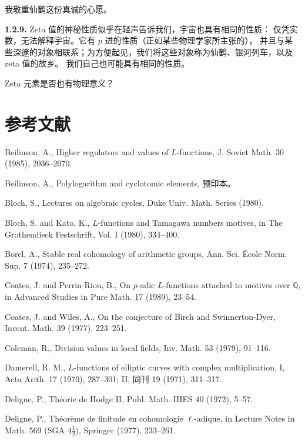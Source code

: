 我敬重仙鹤这份真诚的心愿。

\noindent\textbf{1.2.9.} Zeta 值的神秘性质似乎在轻声告诉我们，宇宙也具有相同的性质：
仅凭实数，无法解释宇宙。它有 $p$ 进的性质（正如某些物理学家所主张的），
并且与某些深邃的对象相联系；为方便起见，我们将这些对象称为仙鹤、银河列车，以及 zeta 值的故乡。
我们自己也可能具有相同的性质。

Zeta 元素是否也有物理意义？

\section*{参考文献}
\begin{description}[style=nextline,leftmargin=3.7em,labelwidth=3.2em,font=\normalfont\small,itemsep=.6em]
\item[{[Be1]}] Beilinson, A., Higher regulators and values of $L$-functions, J. Soviet Math. 30 (1985), 2036--2070.
\item[{[Be2]}] Beilinson, A., Polylogarithm and cyclotomic elements, 预印本。
\item[{[Bl]}] Bloch, S., Lectures on algebraic cycles, Duke Univ. Math. Series (1980).
\item[{[BK]}] Bloch, S. and Kato, K., $L$-functions and Tamagawa numbers motives, in The Grothendieck Festschrift, Vol. I (1980), 334--400.
\item[{[Bo]}] Borel, A., Stable real cohomology of arithmetic groups, Ann. Sci. École Norm. Sup. 7 (1974), 235--272.
\item[{[CP]}] Coates, J. and Perrin-Riou, B., On $p$-adic $L$-functions attached to motives over $\mathbb Q$, in Advanced Studies in Pure Math. 17 (1989), 23--54.
\item[{[CW]}] Coates, J. and Wiles, A., On the conjecture of Birch and Swinnerton-Dyer, Invent. Math. 39 (1977), 223--251.
\item[{[Co]}] Coleman, R., Division values in local fields, Inv. Math. 53 (1979), 91--116.
\item[{[Da]}] Damerell, R. M., $L$-functions of elliptic curves with complex multiplication, I, Acta Arith. 17 (1970), 287--301; II, 同刊 19 (1971), 311--317.
\item[{[De1]}] Deligne, P., Théorie de Hodge II, Publ. Math. IHES 40 (1972), 5--57.
\item[{[De2]}] Deligne, P., Théorème de finitude en cohomologie $\ell$-adique, in Lecture Notes in Math. 569 (SGA $4\frac12$), Springer (1977), 233--261.

\end{description}
